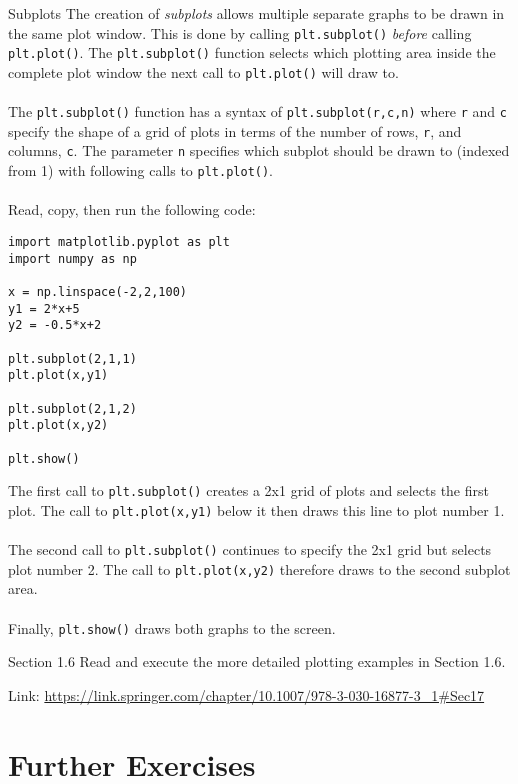 \documentclass{lab}
\begin{document}
\begin{task}{Subplots}{}
The creation of \textit{subplots} allows multiple separate graphs to be drawn in the same plot window. This is done by calling \texttt{plt.subplot()} \textit{before} calling \texttt{plt.plot()}. The \texttt{plt.subplot()} function selects which plotting area inside the complete plot window the next call to \texttt{plt.plot()} will draw to.
\\~\\
The \texttt{plt.subplot()} function has a syntax of \texttt{plt.subplot(r,c,n)} where \texttt{r} and \texttt{c} specify the shape of a grid of plots in terms of the number of rows, \texttt{r}, and columns, \texttt{c}. The parameter \texttt{n} specifies which subplot should be drawn to (indexed from 1) with following calls to \texttt{plt.plot()}.
\\~\\
Read, copy, then run the following code:
\begin{lstlisting}[style=myPython]
import matplotlib.pyplot as plt
import numpy as np

x = np.linspace(-2,2,100)
y1 = 2*x+5
y2 = -0.5*x+2

plt.subplot(2,1,1)
plt.plot(x,y1)

plt.subplot(2,1,2)
plt.plot(x,y2)

plt.show()
\end{lstlisting}
The first call to \texttt{plt.subplot()} creates a 2x1 grid of plots and selects the first plot. The call to \texttt{plt.plot(x,y1)} below it then draws this line to plot number 1.
\\~\\
The second call to \texttt{plt.subplot()} continues to specify the 2x1 grid but selects plot number 2. The call to \texttt{plt.plot(x,y2)} therefore draws to the second subplot area.
\\~\\
Finally, \texttt{plt.show()} draws both graphs to the screen.
\end{task}

\begin{task}{Section 1.6}{}
Read and execute the more detailed plotting examples in Section 1.6.

Link: \url{https://link.springer.com/chapter/10.1007/978-3-030-16877-3_1#Sec17}
\end{task}

\pagebreak
\section{Further Exercises}
\end{document}

